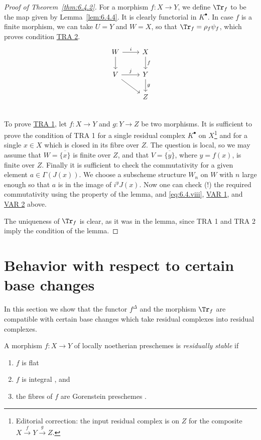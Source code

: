 \begin{proof}[Proof of Theorem~\ref{thm:6.4.2}]
For a morphism $f\colon X\to Y$, we define $\Tr_f$ to be the map given by Lemma~\ref{lem:6.4.4}. It is clearly functorial in $K^\bullet$. In case $f$ is a finite morphism, we can take $U=Y$ and $W=X$, so that $\Tr_f = \rho_f\psi_f$, which proves condition \hyperref[tra:6.4.2]{TRA 2}.
\[\begin{tikzcd}
	W\ar[r,"i"]\ar[d]&X\ar[d,"f"]\\
	V\ar[r,"j"]\ar[rd]&Y\ar[d,"g"]\\
	&Z\\
\end{tikzcd}\]
To prove \hyperref[tra:6.4.1]{TRA 1}, let $f\colon X\to Y$ and $g\colon Y\to Z$ be two morphisms. It is sufficient to prove the condition of TRA 1 for a single residual complex $K^\bullet$ on $X$\footnote{Editorial correction: the input residual complex is on $Z$ for the composite $X\xrightarrow{f}Y\xrightarrow{g}Z$.} and for a single $x\in X$ which is closed in its fibre over $Z$. The question is local, so we may assume that $W = \overline{\{x\}}$ is finite over $Z$, and that $V = \overline{\{y\}}$, where $y=f(x)$, is finite over $Z$. Finally it is sufficient to check the commutativity for a given element $a\in\Gamma(J(x))$. We choose a subscheme structure $W_n$ on $W$ with $n$ large enough so that $a$ is in the image of $i^{y}J(x)$. Now one can check (!) the required commutativity using the property of the lemma, and \eqref{eq:6.4.viii}, \hyperref[var:6.3.1]{VAR 1}, and \hyperref[var:6.3.2]{VAR 2} above.

The uniqueness of $\Tr_f$ is clear, as it was in the lemma, since TRA 1 and TRA 2 imply the condition of the lemma.

\end{proof}

\section{Behavior with respect to certain base changes}\label{sec:6.5}
\begingroup
\setlength{\emergencystretch}{2em}

In this section we show that the functor $f^{\Delta}$ and the morphism $\Tr_{f}$ are compatible with certain base changes which take residual complexes into residual complexes.

\begin{definition*}
A morphism $f\colon X\to Y$ of locally noetherian preschemes is \emph{residually stable} if
\begin{enumerate}
\item[a)] $f$ is flat
\item[b)] $f$ is integral \cite[\nopp II,~6.1.1]{EGA}, and
\item[c)] the fibres of $f$ are Gorenstein preschemes .
\end{enumerate}
\end{definition*}

